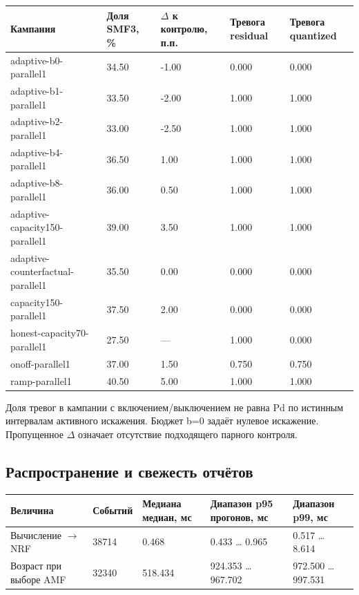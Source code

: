 \documentclass[11pt,a4paper]{article}
\begin{document}
{\footnotesize\setlength{\tabcolsep}{3pt}\renewcommand{\arraystretch}{1.25}
\begin{longtable}{p{3.1cm}p{3.1cm}p{3.1cm}p{3.1cm}p{3.1cm}}
\toprule
Кампания & Доля SMF3, \% & \ensuremath{\Delta} к контролю, п.п. & Тревога residual & Тревога quantized \\
\midrule\endhead
adaptive-b0-parallel1 & 34.50 & -1.00 & 0.000 & 0.000 \\
adaptive-b1-parallel1 & 33.50 & -2.00 & 1.000 & 1.000 \\
adaptive-b2-parallel1 & 33.00 & -2.50 & 1.000 & 1.000 \\
adaptive-b4-parallel1 & 36.50 & 1.00 & 1.000 & 1.000 \\
adaptive-b8-parallel1 & 36.00 & 0.50 & 1.000 & 1.000 \\
adaptive-capacity150-parallel1 & 39.00 & 3.50 & 1.000 & 1.000 \\
adaptive-counterfactual-parallel1 & 35.50 & 0.00 & 0.000 & 0.000 \\
capacity150-parallel1 & 37.50 & 2.00 & 0.000 & 0.000 \\
honest-capacity70-parallel1 & 27.50 & — & 1.000 & 0.000 \\
onoff-parallel1 & 37.00 & 1.50 & 0.750 & 0.750 \\
ramp-parallel1 & 40.50 & 5.00 & 1.000 & 1.000 \\
\bottomrule\end{longtable}}

Доля тревог в кампании с включением/выключением не равна Pd по истинным интервалам активного искажения. Бюджет b=0 задаёт нулевое искажение. Пропущенное \ensuremath{\Delta} означает отсутствие подходящего парного контроля.

\subsection*{Распространение и свежесть отчётов}

{\footnotesize\setlength{\tabcolsep}{3pt}\renewcommand{\arraystretch}{1.25}
\begin{longtable}{p{3.1cm}p{3.1cm}p{3.1cm}p{3.1cm}p{3.1cm}}
\toprule
Величина & Событий & Медиана медиан, мс & Диапазон p95 прогонов, мс & Диапазон p99, мс \\
\midrule\endhead
Вычисление \ensuremath{\to} NRF & 38714 & 0.468 & 0.433 \ldots{} 0.965 & 0.517 \ldots{} 8.614 \\
Возраст при выборе AMF & 32340 & 518.434 & 924.353 \ldots{} 967.702 & 972.500 \ldots{} 997.531 \\
\bottomrule\end{longtable}}
\end{document}
